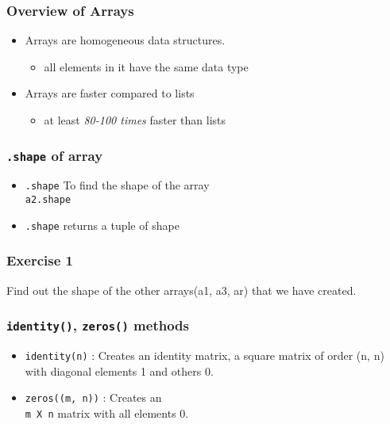 \documentclass[17pt,compress]{beamer}
\begin{document}
\begin{frame}
\frametitle{Overview of Arrays}
\label{sec-4}


\begin{itemize}
\item Arrays are homogeneous data structures.\pause
	\begin{itemize}
	\item all elements in it have the same data type\pause
	\end{itemize}
\item Arrays are faster compared to lists\pause
	\begin{itemize}
	\item at least \emph{80-100 times} faster than lists
	\end{itemize}
\end{itemize}
\end{frame}
\begin{frame}[fragile]
\frametitle{\verb~.shape~ of array}
\label{sec-5}


\begin{itemize}
\item \texttt{.shape}
    To find the shape of the array\\
     \texttt{a2.shape}\pause

\item \texttt{.shape}
    returns a tuple of shape
\end{itemize}
\end{frame}
\begin{frame}
\frametitle{Exercise 1}
\label{sec-6}

  Find out the shape of the other arrays(a1, a3, ar) that we have created.
\end{frame}
\begin{frame}
\frametitle{\texttt{identity()}, \texttt{zeros()} methods}
\label{sec-7}


\begin{itemize}
\item \texttt{identity(n)} :
    Creates an identity matrix, a square matrix of order (n, n) with diagonal elements 1 and others 0.\pause
\item \texttt{zeros((m, n))} :
    Creates an \\\texttt{m X n} matrix with all elements 0.
\end{itemize}
\end{frame}
\end{document}
